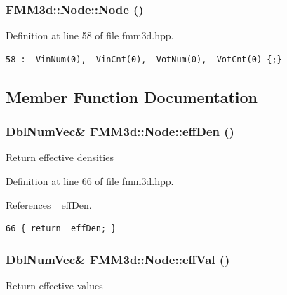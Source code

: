\subsubsection{\setlength{\rightskip}{0pt plus 5cm}FMM3d::Node::Node ()\hspace{0.3cm}{\tt  [inline]}}\label{classFMM3d_1_1Node_cbf468557fa59dd3c0d6c693d060cdcd_cbf468557fa59dd3c0d6c693d060cdcd}




Definition at line 58 of file fmm3d.hpp.

\footnotesize\begin{verbatim}58 : _VinNum(0), _VinCnt(0), _VotNum(0), _VotCnt(0) {;}
\end{verbatim}\normalsize 




\subsection{Member Function Documentation}
\subsubsection{\setlength{\rightskip}{0pt plus 5cm}Dbl\-Num\-Vec\& FMM3d::Node::eff\-Den ()\hspace{0.3cm}{\tt  [inline]}}\label{classFMM3d_1_1Node_d1db194d844074ad9ca4d3235b5303e5_d1db194d844074ad9ca4d3235b5303e5}


Return effective densities 

Definition at line 66 of file fmm3d.hpp.

References \_\-eff\-Den.

\footnotesize\begin{verbatim}66 { return _effDen; }
\end{verbatim}\normalsize 


\subsubsection{\setlength{\rightskip}{0pt plus 5cm}Dbl\-Num\-Vec\& FMM3d::Node::eff\-Val ()\hspace{0.3cm}{\tt  [inline]}}\label{classFMM3d_1_1Node_3c1d2a87442a6fcbc47349d5ba993a8a_3c1d2a87442a6fcbc47349d5ba993a8a}


Return effective values 

